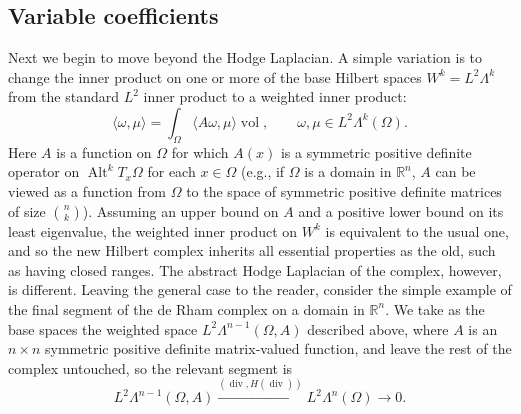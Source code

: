\subsection{{Variable coefficients}}\label{sec:variable-coefficients}

{Next we begin to move beyond the Hodge Laplacian. A simple variation is to change the inner product on one or more of the base Hilbert spaces $W^k=L^2\Lambda^k$ from the standard $L^2$ inner product to a weighted inner product:}
\[
\langle\omega,\mu\rangle=\int_\Omega\langle A\omega,\mu\rangle\operatorname{vol},\qquad\omega,\mu\in L^2\Lambda^k(\Omega).
\]
{Here $A$ is a function on $\Omega$ for which $A(x)$ is a symmetric positive definite operator on $\operatorname{Alt}^kT_x\Omega$ for each $x\in\Omega$ (e.g., if $\Omega$ is a domain in $\mathbb R^n$, $A$ can be viewed as a function from $\Omega$ to the space of symmetric positive definite matrices of size $\binom nk$). Assuming an upper bound on $A$ and a positive lower bound on its least eigenvalue, the weighted inner product on $W^k$ is equivalent to the usual one, and so the new Hilbert complex inherits all essential properties as the old, such as having closed ranges. The abstract Hodge Laplacian of the complex, however, is different. Leaving the general case to the reader, consider the simple example of the final segment of the de Rham complex on a domain in $\mathbb R^n$. We take as the base spaces the weighted space $L^2\Lambda^{n-1}(\Omega,A)$ described above, where $A$ is an $n\times n$ symmetric positive definite matrix-valued function, and leave the rest of the complex untouched, so the relevant segment is}
\begin{equation}\label{eq:weighted-divergence-complex}
L^2\Lambda^{n-1}(\Omega,A)\xrightarrow{(\operatorname{div},H(\operatorname{div}))}L^2\Lambda^n(\Omega)\to0.
\end{equation}

